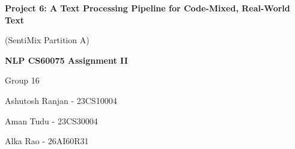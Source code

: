 \begin{titlepage}
    \centering
    \vspace*{3cm}
    
    {\Huge \textbf{Project 6: A Text Processing Pipeline for Code-Mixed, Real-World
Text} \par}
    \vspace{0.5cm}
    {\Large (SentiMix Partition A) \par}
    
    \vspace{2.5cm}
    
    {\Large \textbf{NLP CS60075 Assignment II} \par}
    \vspace{0.5cm}
    {\Large Group 16 \par}
    
    \vspace{2cm}
    
    {\Large Ashutosh Ranjan - 23CS10004 \par}
    \vspace{0.25cm}
    {\Large Aman Tudu - 23CS30004 \par}
    \vspace{0.25cm}
    {\Large Alka Rao - 26AI60R31 \par}
    
    \vfill
\end{titlepage}
